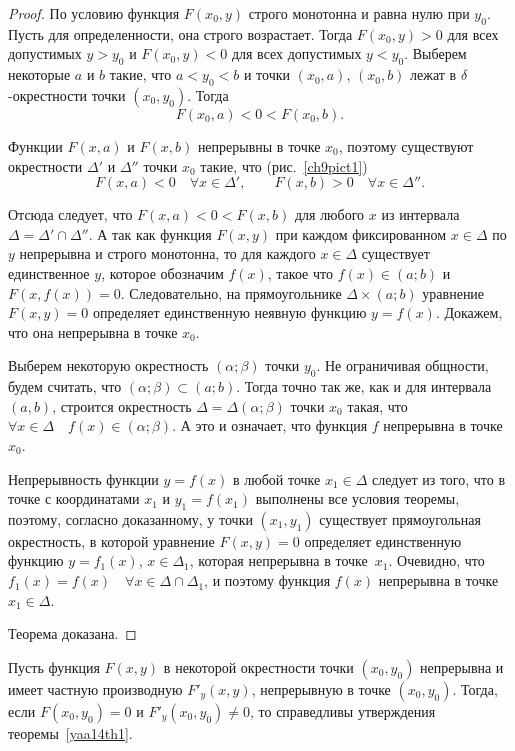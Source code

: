 \begin{proof}

По условию функция $F(x_0,y)$ строго монотонна и равна нулю при  $y_0$.  Пусть для определенности, она строго возрастает. Тогда $F(x_0,y)>0$ для всех допустимых $y>y_0$ и $F(x_0,y)<0$ для всех допустимых $y<y_0$.
Выберем некоторые $a$ и $b$ такие, что $a<y_0<b$ и точки $(x_0,a)$, $(x_0,b)$ лежат в $\delta$-окрестности точки $(x_0,y_0)$. Тогда
$$
F(x_0,a)<0<F(x_0,b).
$$

Функции $F(x,a)$ и $F(x,b)$ непрерывны в точке $x_0$, поэтому существуют окрестности $\Delta'$ и $\Delta''$ точки $x_0$ такие, что (рис.~\ref{ch9pict1})
$$
F(x,a)<0 \quad \forall x\in \Delta', \qquad F(x,b)>0\quad \forall x\in \Delta''.
$$

Отсюда следует, что $F(x,a)<0<F(x,b)$ для любого $x$ из интервала $\Delta = \Delta'\cap\Delta''$. А так как функция $F(x,y)$ при каждом фиксированном $x\in\Delta$ по $y$ непрерывна и строго монотонна, то для каждого $x\in \Delta$ существует единственное $y$, которое обозначим $f(x)$, такое что $f(x)\in(a;b)$ и $F(x,f(x))=0$. Следовательно, на прямоугольнике $\Delta\times(a;b)$ уравнение $F(x,y)=0$ определяет единственную неявную функцию $y=f(x)$. Докажем, что она непрерывна в точке $x_0$.

Выберем некоторую окрестность $(\alpha;\beta)$ точки $y_0$. Не ограничивая общности, будем считать, что $(\alpha;\beta)\subset (a;b)$. Тогда точно так же, как и для интервала $(a,b)$, строится окрестность $\Delta=\Delta(\alpha;\beta)$ точки $x_0$ такая, что $\forall x\in\Delta \quad f(x)\in(\alpha;\beta)$. А это и означает, что функция $f$ непрерывна в точке $x_0$.

Непрерывность функции $y=f(x)$ в любой точке $x_1\in\Delta$ следует из того, что в точке с координатами $x_1$ и $y_1=f(x_1)$ выполнены все условия теоремы, поэтому, согласно доказанному, у точки $(x_1,y_1)$ существует прямоугольная окрестность, в которой уравнение $F(x,y)=0$ определяет единственную функцию $y=f_1(x)$, $x\in\Delta_1$, которая непрерывна в точке~$x_1$. Очевидно, что $f_1(x)=f(x)\quad \forall x\in\Delta\cap\Delta_1$, и поэтому функция $f(x)$ непрерывна в точке~$x_1\in\Delta$.

Теорема доказана.
\end{proof}
\begin{cons}
Пусть функция $F(x,y)$ в некоторой окрестности точки $(x_0,y_0)$ непрерывна и имеет частную производную $F'_y(x,y)$, непрерывную в точке $(x_0,y_0)$. Тогда, если $F(x_0,y_0)=0$ и $F'_y(x_0,y_0)\ne 0 $, то справедливы утверждения теоремы~\ref{yaa14th1}.
\end{cons}

